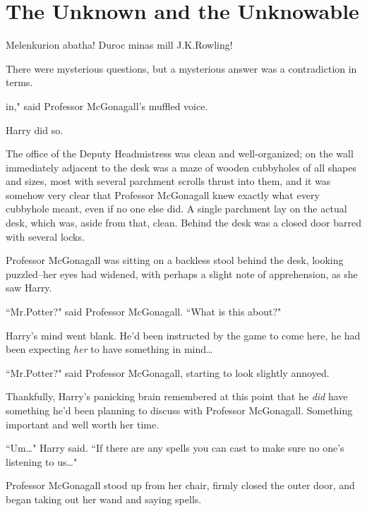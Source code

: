\chapter{The Unknown and the Unknowable}

\begin{chapterOpeningAuthorNote}
Melenkurion abatha! Duroc minas mill J.\?K.\?Rowling!
\end{chapterOpeningAuthorNote}
\begin{chapterOpeningQuote}
There were mysterious questions, but a mysterious answer was a contradiction in terms.
\end{chapterOpeningQuote}

 in," said Professor McGonagall's muffled voice.

\hplettrineextrapara
Harry did so.

The office of the Deputy Headmistress was clean and well-organized; on the wall immediately adjacent to the desk was a maze of wooden cubbyholes of all shapes and sizes, most with several parchment scrolls thrust into them, and it was somehow very clear that Professor McGonagall knew exactly what every cubbyhole meant, even if no one else did. A single parchment lay on the actual desk, which was, aside from that, clean. Behind the desk was a closed door barred with several locks.

Professor McGonagall was sitting on a backless stool behind the desk, looking puzzled\---her eyes had widened, with perhaps a slight note of apprehension, as she saw Harry.

``Mr.\?Potter?" said Professor McGonagall. ``What is this about?"

Harry's mind went blank. He'd been instructed by the game to come here, he had been expecting \emph{her} to have something in mind{\ldots}

``Mr.\?Potter?" said Professor McGonagall, starting to look slightly annoyed.

Thankfully, Harry's panicking brain remembered at this point that he \emph{did} have something he'd been planning to discuss with Professor McGonagall. Something important and well worth her time.

``Um{\ldots}" Harry said. ``If there are any spells you can cast to make sure no one's listening to us{\ldots}"

Professor McGonagall stood up from her chair, firmly closed the outer door, and began taking out her wand and saying spells.

